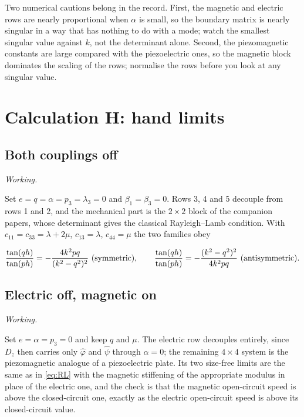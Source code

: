 \documentclass[11pt,a4paper]{article}
\newif\ifshowworked \showworkedtrue
\newenvironment{worked}{\ifshowworked\par\smallskip\noindent\textit{Working.}\par\else\setbox0\vbox\bgroup\fi}{\ifshowworked\par\smallskip\else\egroup\fi}
\newcommand{\bp}{\hat\varphi}
\newcommand{\bpsi}{\hat\psi}
\newcommand{\aME}{\alpha}
\begin{document}
\noindent Two numerical cautions belong in the record. First, the magnetic and electric rows are nearly
proportional when $\aME$ is small, so the boundary matrix is nearly singular in a way that has nothing to do
with a mode; watch the smallest singular value against $k$, not the determinant alone. Second, the
piezomagnetic constants are large compared with the piezoelectric ones, so the magnetic block dominates the
scaling of the rows; normalise the rows before you look at any singular value.

\section{Calculation H: hand limits}\label{sec:H}

\subsection{Both couplings off}

\begin{worked}
Set $e=q=\aME=p_3=\lambda_3=0$ and $\beta_1=\beta_3=0$. Rows 3, 4 and 5 decouple from rows 1 and 2, and the
mechanical part is the $2\times2$ block of the companion papers, whose determinant gives the classical
Rayleigh--Lamb condition. With $c_{11}=c_{33}=\lambda+2\mu$, $c_{13}=\lambda$, $c_{44}=\mu$ the two families
obey
\end{worked}

\begin{equation}\label{eq:RL}
\frac{\tan(qh)}{\tan(ph)}=-\frac{4k^2pq}{(k^2-q^2)^2}\ ({\rm symmetric}),\qquad
\frac{\tan(qh)}{\tan(ph)}=-\frac{(k^2-q^2)^2}{4k^2pq}\ ({\rm antisymmetric}).
\end{equation}

\subsection{Electric off, magnetic on}

\begin{worked}
Set $e=\aME=p_3=0$ and keep $q$ and $\mu$. The electric row decouples entirely, since $D_z$ then carries only
$\bp$ and $\bpsi$ through $\aME=0$; the remaining $4\times4$ system is the piezomagnetic analogue of a
piezoelectric plate. Its two size-free limits are the same as in \eqref{eq:RL} with the magnetic stiffening
of the appropriate modulus in place of the electric one, and the check is that the magnetic open-circuit
speed is above the closed-circuit one, exactly as the electric open-circuit speed is above its
closed-circuit value.
\end{worked}
\end{document}
